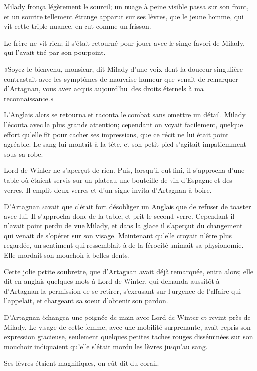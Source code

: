 Milady fronça légèrement le sourcil; un nuage à peine visible passa sur son front, et un sourire tellement étrange apparut sur ses lèvres, que le jeune homme, qui vit cette triple nuance, en eut comme un frisson. 

Le frère ne vit rien; il s'était retourné pour jouer avec le singe favori de Milady, qui l'avait tiré par son pourpoint. 

«Soyez le bienvenu, monsieur, dit Milady d'une voix dont la douceur singulière contrastait avec les symptômes de mauvaise humeur que venait de remarquer d'Artagnan, vous avez acquis aujourd'hui des droits éternels à ma reconnaissance.» 

L'Anglais alors se retourna et raconta le combat sans omettre un détail. Milady l'écouta avec la plus grande attention; cependant on voyait facilement, quelque effort qu'elle fît pour cacher ses impressions, que ce récit ne lui était point agréable. Le sang lui montait à la tête, et son petit pied s'agitait impatiemment sous sa robe. 

Lord de Winter ne s'aperçut de rien. Puis, lorsqu'il eut fini, il s'approcha d'une table où étaient servis sur un plateau une bouteille de vin d'Espagne et des verres. Il emplit deux verres et d'un signe invita d'Artagnan à boire. 

D'Artagnan savait que c'était fort désobliger un Anglais que de refuser de toaster avec lui. Il s'approcha donc de la table, et prit le second verre. Cependant il n'avait point perdu de vue Milady, et dans la glace il s'aperçut du changement qui venait de s'opérer sur son visage. Maintenant qu'elle croyait n'être plus regardée, un sentiment qui ressemblait à de la férocité animait sa physionomie. Elle mordait son mouchoir à belles dents. 

Cette jolie petite soubrette, que d'Artagnan avait déjà remarquée, entra alors; elle dit en anglais quelques mots à Lord de Winter, qui demanda aussitôt à d'Artagnan la permission de se retirer, s'excusant sur l'urgence de l'affaire qui l'appelait, et chargeant sa soeur d'obtenir son pardon. 

D'Artagnan échangea une poignée de main avec Lord de Winter et revint près de Milady. Le visage de cette femme, avec une mobilité surprenante, avait repris son expression gracieuse, seulement quelques petites taches rouges disséminées sur son mouchoir indiquaient qu'elle s'était mordu les lèvres jusqu'au sang. 

Ses lèvres étaient magnifiques, on eût dit du corail. 

